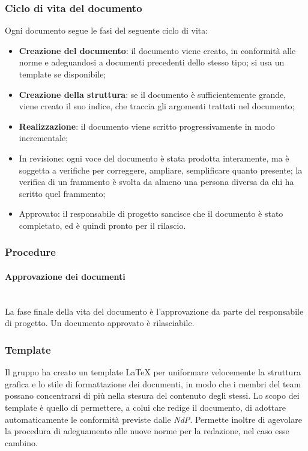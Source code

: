 	\subsubsection{Ciclo di vita del documento}
	Ogni documento segue le fasi del seguente ciclo di vita:
	\begin{itemize}
		\item \textbf{Creazione del documento}: il documento viene creato, in conformità alle norme e adeguandosi a documenti precedenti dello stesso tipo; si usa un template se disponibile;
		\item \textbf{Creazione della struttura}: se il documento è sufficientemente grande, viene creato il suo indice, che traccia gli argomenti trattati nel documento;
		\item \textbf{Realizzazione}: il documento viene scritto progressivamente in modo incrementale;
		\item In revisione: ogni voce del documento è stata prodotta interamente, ma è soggetta a verifiche per correggere, ampliare, semplificare quanto presente; la verifica di un frammento è svolta da almeno una persona diversa da chi ha scritto quel frammento;
		\item Approvato: il responsabile di progetto sancisce che il documento è stato completato, ed è quindi pronto per il rilascio.
	\end{itemize}

	\subsubsection{Procedure}	
		\paragraph{Approvazione dei documenti} \mbox{}\\
		La fase finale della vita del documento è l'approvazione da parte del responsabile di progetto. Un documento approvato è rilasciabile. 
		\subsubsection{Template}
		Il gruppo ha creato un template \LaTeX{} per uniformare velocemente la struttura grafica e lo stile di formattazione dei documenti, in modo che i membri del team possano concentrarsi di più nella stesura del contenuto degli stessi. Lo scopo dei template è quello di permettere, a colui che redige il documento, di adottare automaticamente le conformità previste dalle \textit{NdP}. Permette inoltre di agevolare la procedura di adeguamento alle nuove norme per la redazione, nel caso esse cambino.
